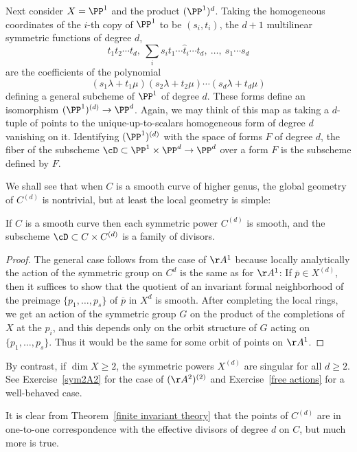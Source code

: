 Next consider $X = \PP^1$ and the product $(\PP^1)^d$. Taking the homogeneous coordinates of the
$i$-th copy of $\PP^1$ to be $(s_i,t_i)$, the $d+1$ multilinear symmetric functions of degree $d$,
$$
t_1t_2\cdots t_d,\ \sum_i s_it_1\cdots\hat t_i\cdots t_d,\ \dots,\ s_1\cdots s_d
$$
are the coefficients of the polynomial
$$
(s_1\lambda + t_1\mu)(s_2\lambda + t_2\mu)\cdots(s_d\lambda + t_d\mu)
$$
defining a general subcheme of $\PP^1$ of degree $d$. These forms  define
an isomorphism $(\PP^1)^{(d)} \to \PP^d$. 
Again, we may think of this map as taking a $d$-tuple of points to the unique-up-to-scalars
homogeneous form of degree $d$ vanishing on it.
Identifying $(\PP^1)^{(d)}$ with the space of forms
$F$ of degree $d$, the fiber of the subscheme $\cD\subset \PP^1 \times \PP^d \to \PP^d$
over a form $F$ is the subscheme defined by $F$.

We shall see that when $C$ is a smooth curve of higher genus, the global geometry of $C^{(d)}$ is nontrivial, but at least the local geometry is simple:

\begin{proposition}
If $C$ is a smooth curve then each symmetric power $C^{(d)}$ is smooth, and the subscheme
$\cD \subset C\times C^{(d)}$ is a family of divisors.
\end{proposition}

\begin{proof}
 The general case follows from the case of $\AA^{1}$ because locally analytically the action of the symmetric group on $C^d$ is the same as for $\AA^1$: If  $\overline p \in X^{(d)}$, then it suffices to
 show that the quotient of an invariant formal neighborhood of the preimage $\{p_1,\dots, p_s\}$ of
 $\overline p$ in $X^d$  is smooth. After completing the local rings, we get an action of the symmetric group
 $G$ on the product of the completions of $X$ at the $p_i$, and this depends only on the orbit
 structure of $G$ acting on $\{p_1,\dots, p_s\}$. Thus it would be the same for some orbit of
 points on $\AA^1$.
 \end{proof}

By contrast, if $\dim X \geq 2$, the symmetric powers $X^{(d)}$ are singular for all $d \geq 2$.
See Exercise~\ref{sym2A2} for the case of $(\AA^2)^{(2)}$ and Exercise~\ref{free actions} for a well-behaved case.

It is clear from Theorem~\ref{finite invariant theory} that the points of $C^{(d)}$ are in one-to-one correspondence with the effective divisors of
degree $d$ on $C$, but much more is true. 

